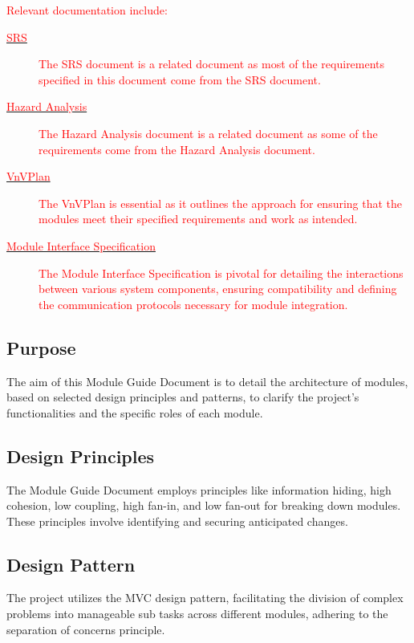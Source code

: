 \documentclass[12pt, titlepage]{article}
\newcommand{\rt}[1]{\textcolor{red}{#1}}
\begin{document}
\rt{Relevant documentation include:}
\begin{description}
\item[\href{https://github.com/InfiniView-AI/MotionMingle/blob/main/docs/SRS/SRS.pdf}{\rt{SRS}}]
 \rt{The SRS document is a related document as most of the requirements specified
  in this document come from the SRS document.}
\item[\href{https://github.com/InfiniView-AI/MotionMingle/blob/main/docs/HazardAnalysis/HazardAnalysis.pdf}{\rt{Hazard Analysis}}]
  \rt{The Hazard Analysis document is a related document as some of the requirements
  come from the Hazard Analysis document.}
\item[\href{https://github.com/InfiniView-AI/MotionMingle/blob/main/docs/VnVPlan/VnVPlan.pdf}{\rt{VnVPlan}}]
  \rt{The VnVPlan is essential as it outlines the approach for ensuring that the modules meet their specified requirements and work as intended.}
\item[\href{https://github.com/InfiniView-AI/MotionMingle/blob/main/docs/Design/SoftDetailedDes/MIS.pdf}{\rt{Module Interface Specification}}]
  \rt{The Module Interface Specification is pivotal for detailing the interactions between various system components, ensuring compatibility and defining the communication protocols necessary for module integration.}
\end{description}


\subsection{Purpose}
The aim of this Module Guide Document is to detail the architecture of modules, based on selected design principles and patterns, to clarify the project’s functionalities and the specific roles of each module.

\subsection{Design Principles}
The Module Guide Document employs principles like information hiding, high cohesion, low coupling, high fan-in, and low fan-out for breaking down modules. These principles involve identifying and securing anticipated changes.

\subsection{Design Pattern}
The project utilizes the MVC design pattern, facilitating the division of complex problems into manageable sub tasks across different modules, adhering to the separation of concerns principle.
\end{document}
